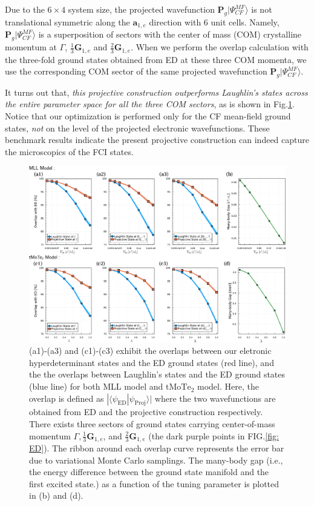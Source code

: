 Due to the $6\times4$ system size, the projected wavefunction $\mathbf P_g|\Psi^{MF}_{CF}\rangle$ is not translational symmetric along the $\mathbf a_{1,e}$ direction with $6$ unit cells. Namely, $\mathbf P_g|\Psi^{MF}_{CF}\rangle$ is a superposition of sectors with the center of mass (COM) crystalline momentum at $\Gamma$, $\frac{1}{3}\mathbf G_{1,e}$ and $\frac{2}{3}\mathbf G_{1,e}$. When we perform the overlap calculation with the three-fold ground states obtained from ED at these three COM momenta, we use the corresponding COM sector of the same projected wavefunction $\mathbf P_g|\Psi^{MF}_{CF}\rangle$.

It turns out that, \emph{this projective construction outperforms Laughlin's states across the entire parameter space for all the three COM sectors}, as is shown in Fig.\ref{fig: ED overlap}. Notice that our optimization is performed only for the CF mean-field ground states, \emph{not} on the level of the projected electronic wavefunctions. These benchmark results indicate the present projective construction can indeed capture the microscopics of the FCI states.

\begin{figure}
    \centering
    \includegraphics[width=\textwidth]{figures/FCI/combined_overlap.pdf}
    \caption{(a1)-(a3) and (c1)-(c3) exhibit the overlaps between our eletronic hyperdeterminant states and the ED ground states (red line), and the the overlaps between Laughlin's states and the ED ground states (blue line) for both MLL model and $\mathrm{tMoTe_2}$ model. Here, the overlap is defined as $|\langle \psi_{\text{ED}}|\psi_{\text{Proj}}\rangle|$ where the two wavefunctions are obtained from ED and the projective construction respectively. There exists three sectors of ground states carrying center-of-mass momentum $\Gamma, \frac{1}{3}\mathbf G_{1,e}$, and $\frac{2}{3}\mathbf G_{1,e}$ (the dark purple points in FIG.\ref{fig: ED}). The ribbon around each overlap curve represents the error bar due to variational Monte Carlo samplings. The many-body gap (i.e., the energy difference between the ground state manifold and the first excited state.) as a function of the tuning parameter is plotted in (b) and (d).}
    \label{fig: ED overlap}
\end{figure}

